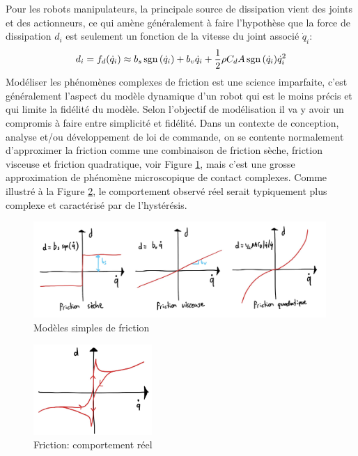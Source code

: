 Pour les robots manipulateurs, la principale source de dissipation vient des joints et des actionneurs, ce qui amène généralement à faire l'hypothèse que la force de dissipation $d_i$ est seulement un fonction de la vitesse du joint associé $\dot{q}_i$:
\begin{align}
d_i = f_d( \dot{q}_i ) \approx b_s \operatorname{sgn}{(\dot{q}_i)} + b_v \dot{q}_i + \frac{1}{2}\rho C_d A \operatorname{sgn}{(\dot{q}_i)} \dot{q}_i^2
\end{align}
Modéliser les phénomènes complexes de friction est une science imparfaite, c'est généralement l'aspect du modèle dynamique d'un robot qui est le moins précis et qui limite la fidélité du modèle. Selon l'objectif de modélisation il va y avoir un compromis à faire entre simplicité et fidélité. Dans un contexte de conception, analyse et/ou développement de loi de commande, on se contente normalement d'approximer la friction comme une combinaison de friction sèche, friction visceuse et friction quadratique, voir Figure \ref{fig:frictionmodels}, mais c'est une grosse approximation de phénomène microscopique de contact complexes. Comme illustré à la Figure \ref{fig:frictionreal}, le comportement observé réel serait typiquement plus complexe et caractérisé par de l'hystérésis.
\begin{figure}[ht]
	\centering
		\includegraphics[width=0.99\textwidth]{fig/frictionmodels.jpg}
	\caption{Modèles simples de friction}%
	\label{fig:frictionmodels}
\end{figure}

\begin{figure}[ht]
	\centering
		\includegraphics[width=0.40\textwidth]{fig/frictionreal.jpg}
	\caption{Friction: comportement réel}%
	\label{fig:frictionreal}
\end{figure}



